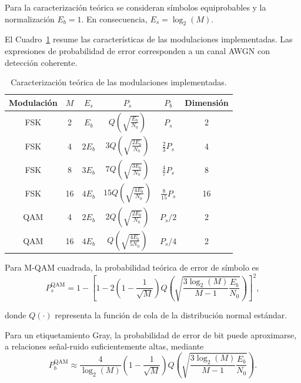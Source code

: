 Para la caracterización teórica se consideran símbolos
equiprobables y la normalización $E_b=1$. En consecuencia,
$E_s=\log_2(M)$.

El Cuadro~\ref{tab:modulaciones} resume las características
de las modulaciones implementadas. Las expresiones de
probabilidad de error corresponden a un canal AWGN con
detección coherente.

\begin{table}[htbp]
    \centering
    \begin{tabular}{cccccc}
        \toprule
        Modulación & $M$ & $E_s$ & $P_s$ & $P_b$ & Dimensión \\
        \midrule
        FSK & 2  & $  E_b$ & $   Q\left( \sqrt{ \frac{E_b}{N_0} } \right)$   & $P_s$ & 2 \\
        FSK & 4  & $2 E_b$ & $ 3 Q\left( \sqrt{ \frac{2 E_b}{N_0} } \right)$ & $\frac{2}{3} P_s$ & 4 \\
        FSK & 8  & $3 E_b$ & $ 7 Q\left( \sqrt{ \frac{3 E_b}{N_0} } \right)$ & $\frac{4}{7} P_s$ & 8 \\
        FSK & 16 & $4 E_b$ & $15 Q\left( \sqrt{ \frac{4 E_b}{N_0} } \right)$ & $\frac{8}{15} P_s$ & 16 \\
        QAM & 4  & $2 E_b$ & $ 2 Q\left( \sqrt{ \frac{2 E_b}{N_0} } \right)$ & $P_s / 2$ & 2 \\
        QAM & 16 & $4 E_b$ & $   Q\left( \sqrt{ \frac{4 E_b}{5 N_0} } \right)$ & $P_s / 4$ & 2 \\
        \bottomrule
    \end{tabular}
    \caption{Caracterización teórica de las modulaciones implementadas.}
    \label{tab:modulaciones}
\end{table}

Para M-QAM cuadrada, la probabilidad teórica de error
de símbolo es
\begin{equation}
    P_s^{\mathrm{QAM}} =
    1-
    \left[
        1-
        2\left(1-\frac{1}{\sqrt{M}}\right)
        Q\left(
            \sqrt{
                \frac{3\log_2(M)}{M-1}
                \frac{E_b}{N_0}
            }
        \right)
    \right]^2,
\end{equation}

donde $Q(\cdot)$ representa la función de cola de la
distribución normal estándar.

Para un etiquetamiento Gray, la probabilidad de error
de bit puede aproximarse, a relaciones señal-ruido
suficientemente altas, mediante
\begin{equation}
    P_b^{\mathrm{QAM}} \approx
    \frac{4}{\log_2(M)}
    \left(1-\frac{1}{\sqrt{M}}\right)
    Q\left(
        \sqrt{
            \frac{3\log_2(M)}{M-1}
            \frac{E_b}{N_0}
        }
    \right).
\end{equation}

